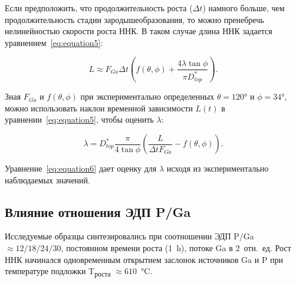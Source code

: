 Если предположить, что продолжительность роста (\(\Delta t\)) намного больше, чем продолжительность стадии зародышеобразования, то можно пренебречь нелинейностью скорости роста ННК. В таком случае длина ННК задается уравнением~\ref{eq:equation5}:

\begin{equation}
	\label{eq:equation5}
	L\approx F_{Ga} \Delta t \left( f(\theta,\phi) + \frac{4 \lambda \tan{\phi}}{\pi D_{top}^\ast} \right).
\end{equation}

Зная \(F_ {Ga}\) и \(f(\theta,\phi)\) при экспериментально определенных \(\theta = 120\si{\degree}\) и \(\phi = 34\si{\degree}\), можно использовать наклон временной зависимости \(L(t)\) в уравнении~\ref{eq:equation5}, чтобы оценить \(\lambda\):

\begin{equation}
	\label{eq:equation6}
	\lambda=D_{top}^\ast \frac{\pi}{4\tan{\phi}} \left( \frac{L}{\Delta t F_{Ga}}-f(\theta,\phi) \right).
\end{equation}

Уравнение~\ref{eq:equation6} дает оценку для \(\lambda\) исходя из экспериментально наблюдаемых значений.

\subsection{Влияние отношения ЭДП P/Ga}\label{subsec:ch6/sec2/sub3}


Исследуемые образцы синтезировались при соотношении ЭДП P/Ga \(\approx
12/18/24/30\), постоянном времени роста (1~\si{\hour}), потоке Ga в 2~отн.~ед.
Рост ННК начинался одновременным открытием заслонок источников Ga и P при
температуре подложки T\textsubscript{роста} \(\approx
610\)~\si{\degreeCelsius}.

